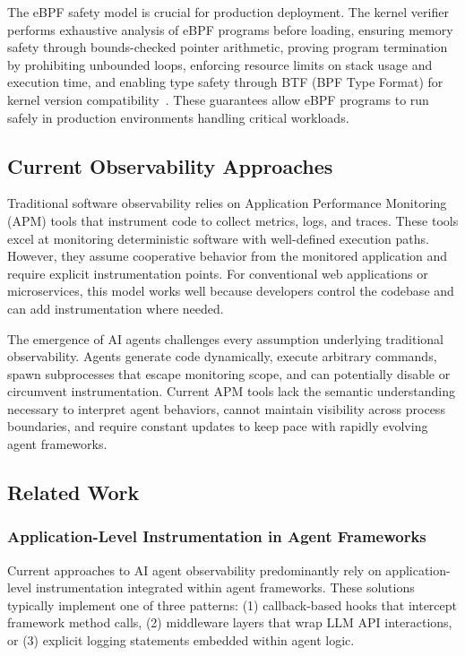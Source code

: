 The eBPF safety model is crucial for production deployment. The kernel verifier performs exhaustive analysis of eBPF programs before loading, ensuring memory safety through bounds-checked pointer arithmetic, proving program termination by prohibiting unbounded loops, enforcing resource limits on stack usage and execution time, and enabling type safety through BTF (BPF Type Format) for kernel version compatibility~\cite{kerneldoc}. These guarantees allow eBPF programs to run safely in production environments handling critical workloads.

\subsection{Current Observability Approaches}

Traditional software observability relies on Application Performance Monitoring (APM) tools that instrument code to collect metrics, logs, and traces. These tools excel at monitoring deterministic software with well-defined execution paths. However, they assume cooperative behavior from the monitored application and require explicit instrumentation points. For conventional web applications or microservices, this model works well because developers control the codebase and can add instrumentation where needed.

The emergence of AI agents challenges every assumption underlying traditional observability. Agents generate code dynamically, execute arbitrary commands, spawn subprocesses that escape monitoring scope, and can potentially disable or circumvent instrumentation. Current APM tools lack the semantic understanding necessary to interpret agent behaviors, cannot maintain visibility across process boundaries, and require constant updates to keep pace with rapidly evolving agent frameworks.

\subsection{Related Work}

\subsubsection{Application-Level Instrumentation in Agent Frameworks}

Current approaches to AI agent observability predominantly rely on application-level instrumentation integrated within agent frameworks. These solutions typically implement one of three patterns: (1) callback-based hooks that intercept framework method calls, (2) middleware layers that wrap LLM API interactions, or (3) explicit logging statements embedded within agent logic.


